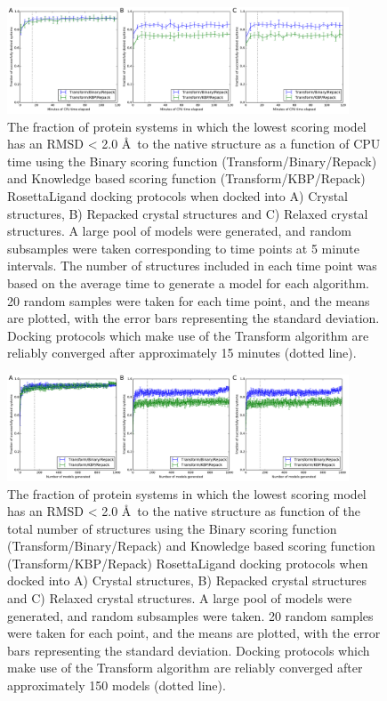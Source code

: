 \begin{figure}
\centering
\includegraphics[width=4in]{figures/lowres_appendix/fraction_successful_time_supplement.pdf}
\caption{
The fraction of protein systems in which the lowest scoring model has an \acs{RMSD} < 2.0 \AA\ to the native structure as a function of \acs{CPU} time using the Binary scoring function (Transform/Binary/Repack) and Knowledge based scoring function (Transform/\acs{KBP}/Repack) RosettaLigand docking protocols when docked into A) Crystal structures, B) Repacked crystal structures and C) Relaxed crystal structures. 
A large pool of models were generated, and random subsamples were taken corresponding to time points at 5 minute intervals.
The number of structures included in each time point was based on the average time to generate a model for each algorithm.
20 random samples were taken for each time point, and the means are plotted, with the error bars representing the standard deviation. Docking protocols which make use of the Transform algorithm are reliably converged after approximately 15 minutes (dotted line).  
}
\label{fig:frac_time}
\end{figure}

\begin{figure}
\centering
\includegraphics[width=4in]{figures/lowres_appendix/fraction_successful_count_supplement.pdf}
\caption{
The fraction of protein systems in which the lowest scoring model has an \acs{RMSD} < 2.0 \AA\ to the native structure as function of the total number of structures using the Binary scoring function (Transform/Binary/Repack) and Knowledge based scoring function (Transform/\acs{KBP}/Repack) RosettaLigand docking protocols when docked into A) Crystal structures, B) Repacked crystal structures and C) Relaxed crystal structures.
A large pool of models were generated, and random subsamples were taken.
20 random samples were taken for each point, and the means are plotted, with the error bars representing the standard deviation.
Docking protocols which make use of the Transform algorithm are reliably converged after approximately 150 models (dotted line).
}
\label{fig:frac_count}
\end{figure}


